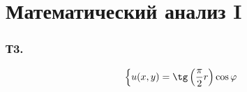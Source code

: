 \section{Математический анализ I}
\subsubsection*{Т3.}
$$
\left\{
    \begin{aligned}
        u(x, y) = \tg\left(\frac{\pi}{2}r\right) \cos \varphi
    \end{aligned}
\right.
$$


